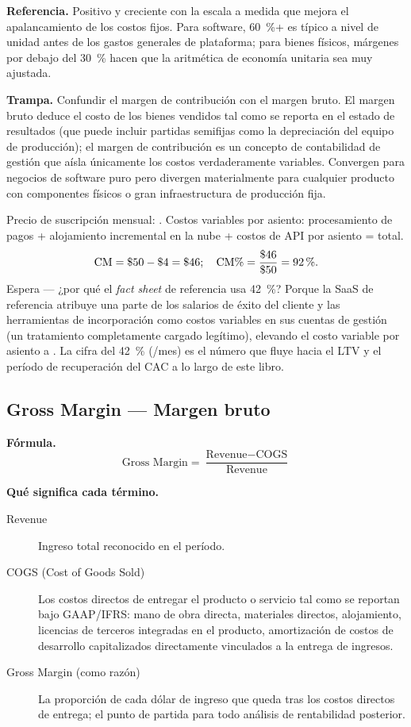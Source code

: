 \textbf{Referencia.} Positivo y creciente con la escala a medida que mejora el apalancamiento
de los costos fijos. Para software, \qty{60}{\percent}+ es típico a nivel de unidad antes de
los gastos generales de plataforma; para bienes físicos, márgenes por debajo del
\qty{30}{\percent} hacen que la aritmética de economía unitaria sea muy ajustada.

\textbf{Trampa.} Confundir el margen de contribución con el margen bruto. El margen bruto
deduce el costo de los bienes vendidos tal como se reporta en el estado de resultados (que
puede incluir partidas semifijas como la depreciación del equipo de producción); el margen
de contribución es un concepto de contabilidad de gestión que aísla únicamente los costos
verdaderamente variables. Convergen para negocios de software puro pero divergen
materialmente para cualquier producto con componentes físicos o gran infraestructura de
producción fija.

\begin{example}
Precio de suscripción mensual: . Costos variables por asiento: procesamiento de
pagos  + alojamiento incremental en la nube  + costos de API por
asiento  =  total.
\[
  \text{CM} = \$\num{50} - \$\num{4} = \$\num{46}; \quad
  \text{CM\%} = \frac{\$\num{46}}{\$\num{50}} = \qty{92}{\percent}.
\]
Espera --- ¿por qué el \emph{fact sheet} de referencia usa \qty{42}{\percent}? Porque la
SaaS de referencia atribuye una parte de los salarios de éxito del cliente y las herramientas
de incorporación como costos variables en sus cuentas de gestión (un tratamiento completamente
cargado legítimo), elevando el costo variable por asiento a . La cifra del
\qty{42}{\percent} (/mes) es el número que fluye hacia el LTV y el período de
recuperación del CAC a lo largo de este libro.
\end{example}


\subsection{Gross Margin --- Margen bruto}

\textbf{Fórmula.}
\[
  \text{Gross Margin} = \frac{\text{Revenue} - \text{COGS}}{\text{Revenue}}
\]

\textbf{Qué significa cada término.}
\begin{description}
  \item[Revenue] Ingreso total reconocido en el período.
  \item[COGS (Cost of Goods Sold)] Los costos directos de entregar el producto o servicio
    tal como se reportan bajo GAAP/IFRS: mano de obra directa, materiales directos,
    alojamiento, licencias de terceros integradas en el producto, amortización de costos de
    desarrollo capitalizados directamente vinculados a la entrega de ingresos.
  \item[Gross Margin (como razón)] La proporción de cada dólar de ingreso que queda tras los
    costos directos de entrega; el punto de partida para todo análisis de rentabilidad
    posterior.
\end{description}

